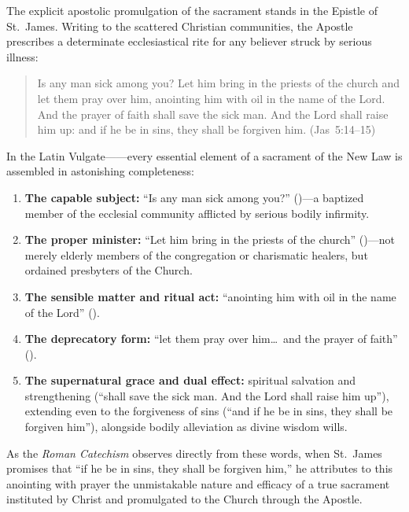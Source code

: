 The explicit apostolic promulgation of the sacrament stands in the Epistle of St.~James. Writing to the scattered Christian communities, the Apostle prescribes a determinate ecclesiastical rite for any believer struck by serious illness:
\begin{quotation}
Is any man sick among you? Let him bring in the priests of the church and let them pray over him, anointing him with oil in the name of the Lord. And the prayer of faith shall save the sick man. And the Lord shall raise him up: and if he be in sins, they shall be forgiven him. (Jas~5:14--15)
\end{quotation}
In the Latin Vulgate------every essential element of a sacrament of the New Law is assembled in astonishing completeness:
\begin{enumerate}
  \item \textbf{The capable subject:} ``Is any man sick among you?'' ()---a baptized member of the ecclesial community afflicted by serious bodily infirmity.
  \item \textbf{The proper minister:} ``Let him bring in the priests of the church'' ()---not merely elderly members of the congregation or charismatic healers, but ordained presbyters of the Church.
  \item \textbf{The sensible matter and ritual act:} ``anointing him with oil in the name of the Lord'' ().
  \item \textbf{The deprecatory form:} ``let them pray over him\ldots\ and the prayer of faith'' ().
  \item \textbf{The supernatural grace and dual effect:} spiritual salvation and strengthening (``shall save the sick man. And the Lord shall raise him up''), extending even to the forgiveness of sins (``and if he be in sins, they shall be forgiven him''), alongside bodily alleviation as divine wisdom wills.
\end{enumerate}
As the \emph{Roman Catechism} observes directly from these words, when St.~James promises that ``if he be in sins, they shall be forgiven him,'' he attributes to this anointing with prayer the unmistakable nature and efficacy of a true sacrament instituted by Christ and promulgated to the Church through the Apostle.

